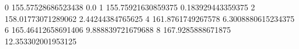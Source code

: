 0 155.57528686523438 0.0
1 155.75921630859375 0.183929443359375
2 158.01773071289062 2.44244384765625
4 161.8761749267578 6.3008880615234375
6 165.46412658691406 9.888839721679688
8 167.9285888671875 12.353302001953125
